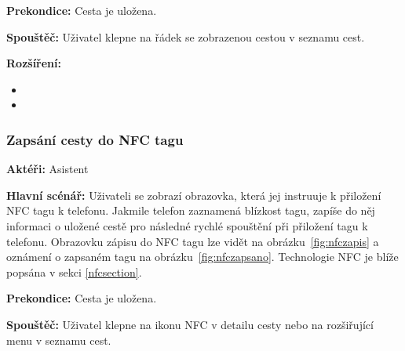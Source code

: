 \documentclass[czech,master,public,dept460,male,java,cpdeclaration]{diploma}
\newcommand{\usecase}[2]{\subsubsection{#1}\label{#2}}
\begin{document}
\vspace{0.1cm}
\noindent
\textbf{Prekondice:} Cesta je uložena.

\vspace{0.1cm}
\noindent
\textbf{Spouštěč:} Uživatel klepne na řádek se zobrazenou cestou v seznamu cest.

\vspace{0.1cm}
\noindent
\textbf{Rozšíření:}
\begin{itemize}
  \item {}
  \item {}
\end{itemize}






\usecase{Zapsání cesty do NFC tagu}{nfczapis}
\textbf{Aktéři:} Asistent

\vspace{0.1cm}
\noindent
\textbf{Hlavní scénář:} Uživateli se zobrazí
obrazovka, která jej instruuje k přiložení NFC tagu k telefonu. Jakmile telefon zaznamená blízkost tagu,
zapíše do něj informaci o uložené cestě pro následné rychlé spouštění při přiložení tagu k telefonu.
Obrazovku zápisu do NFC tagu lze vidět na obrázku~\ref{fig:nfczapis} a oznámení o zapsaném tagu
na obrázku~\ref{fig:nfczapsano}. Technologie NFC je blíže popsána v sekci \ref{nfcsection}.

\vspace{0.1cm}
\noindent
\textbf{Prekondice:} Cesta je uložena.

\vspace{0.1cm}
\noindent
\textbf{Spouštěč:} Uživatel klepne na ikonu NFC v detailu cesty nebo na rozšiřující menu v seznamu cest.
\end{document}
